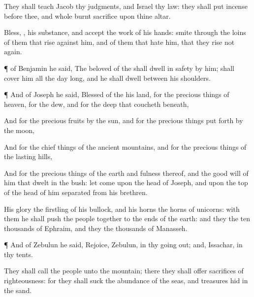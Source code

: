 {They shall
teach
Jacob thy
judgments, and
Israel thy
law: they shall
put
incense
before thee, and whole burnt
sacrifice upon thine
altar.

Bless,
{}, his
substance, and
accept the
work of his
hands:
smite through the
loins of them that
rise against him, and of them that
hate him, that they
rise
not
again.


\par }{\PP {}¶
{} of
Benjamin he
said, The
beloved of the
{} shall
dwell in
safety by him;
{} shall
cover him all the
day long, and he shall
dwell between his
shoulders.


\par }{\PP {}¶ And of
Joseph he
said,
Blessed of the
{}
{} his
land, for the precious
things of
heaven, for the
dew, and for the
deep that coucheth
beneath,

And for the
precious
fruits
{} by the
sun, and for the precious
things put
forth by the
moon,

And for the chief
things of the
ancient
mountains, and for the precious
things of the
lasting
hills,

And for the precious
things of the
earth and
fulness thereof, and
{} the good
will of him that
dwelt in the
bush: let
{}
come upon the
head of
Joseph, and upon the top of the
head of him
{}
separated from his
brethren.

His
glory
{} the
firstling of his
bullock, and his
horns
{} the
horns of
unicorns: with them he shall
push the
people
together to the
ends of the
earth: and they
{} the ten
thousands of
Ephraim, and they
{} the
thousands of
Manasseh.


\par }{\PP {}¶ And of
Zebulun he
said,
Rejoice,
Zebulun, in thy going
out; and,
Issachar, in thy
tents.

They shall
call the
people unto the
mountain; there they shall
offer
sacrifices of
righteousness: for they shall
suck
{} the
abundance of the
seas, and
{}
treasures
hid in the
sand.


}
